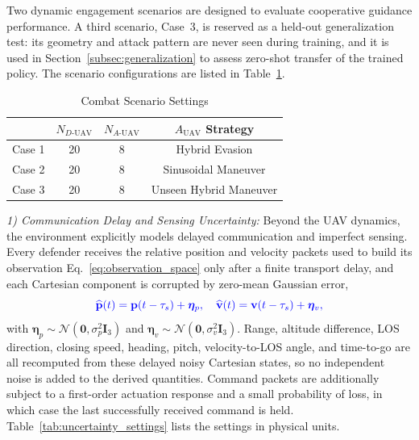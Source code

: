 \documentclass[lettersize,journal]{IEEEtran}
\newcommand{\hladd}[1]{{\color{blue}#1}}
\begin{document}
Two dynamic engagement scenarios are designed to evaluate cooperative guidance performance.
\hladd{A third scenario, Case~3, is reserved as a held-out generalization test: its geometry and
attack pattern are never seen during training, and it is used in
Section~\ref{subsec:generalization} to assess zero-shot transfer of the trained policy.}
The scenario configurations are listed in Table~\ref{changjingqingkuang}.

\begin{table}[!t]
\centering
\renewcommand{\arraystretch}{1.4}
\caption{Combat Scenario Settings}
\label{changjingqingkuang}
\begin{tabular}{cccc}
\hline\hline
 & $N_{D\text{-UAV}}$ & $N_{A\text{-UAV}}$ & $A_{\text{UAV}}$ Strategy \\ \hline
Case 1 & 20 & 8 & Hybrid Evasion \\
Case 2 & 20 & 8 & Sinusoidal Maneuver \\
\hladd{Case 3} & \hladd{20} & \hladd{8} & \hladd{Unseen Hybrid Maneuver} \\ \hline
\end{tabular}
\end{table}

\hladd{\emph{1) Communication Delay and Sensing Uncertainty:} Beyond the UAV dynamics, the
environment explicitly models delayed communication and imperfect sensing. Every defender
receives the relative position and velocity packets used to build its observation
Eq.~\eqref{eq:observation_space} only after a finite transport delay, and each Cartesian
component is corrupted by zero-mean Gaussian error,}
\begin{equation}
\label{eq:noise_model}
{\color{blue}
\widehat{\mathbf{p}}(t)=\mathbf{p}(t-\tau_s)+\boldsymbol{\eta}_p,\quad
\widehat{\mathbf{v}}(t)=\mathbf{v}(t-\tau_s)+\boldsymbol{\eta}_v,}
\end{equation}
\hladd{with $\boldsymbol{\eta}_p\sim\mathcal{N}(\mathbf{0},\sigma_p^2\mathbf{I}_3)$ and
$\boldsymbol{\eta}_v\sim\mathcal{N}(\mathbf{0},\sigma_v^2\mathbf{I}_3)$. Range, altitude
difference, LOS direction, closing speed, heading, pitch, velocity-to-LOS angle, and
time-to-go are all recomputed from these delayed noisy Cartesian states, so no independent
noise is added to the derived quantities. Command packets are additionally subject to a
first-order actuation response and a small probability of loss, in which case the last
successfully received command is held. Table~\ref{tab:uncertainty_settings} lists the settings
in physical units.}
\end{document}
